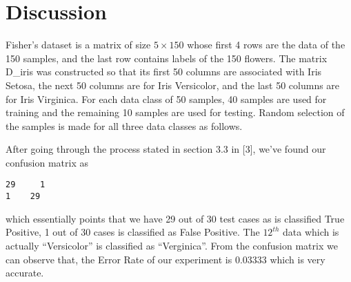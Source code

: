 \section{Discussion}
\label{sect:discussion}
Fisher’s dataset is a matrix of size $5\times150$ whose first 4 rows are the data of the 150 samples, and the last row contains labels of the 150 flowers. The matrix D\_iris was constructed so that its first 50 columns are associated with Iris Setosa, the next 50 columns are for Iris Versicolor, and the last 50 columns are for Iris Virginica. For each data class of 50 samples, 40 samples are used for training and the remaining 10 samples are used for testing. Random selection of the samples is made for all three data classes as follows. 

After going through the process stated in section 3.3 in [3], we've found our confusion matrix as
\begin{verbatim}
29     1
1    29
\end{verbatim}
which essentially points that we have 29 out of 30 test cases as is classified True Positive, 1 out of 30 cases is classified as False Positive. The $12^{th}$ data which is actually ``Versicolor'' is classified as ``Verginica''. From the confusion matrix we can observe that, the Error Rate of our experiment is 0.03333 which is very accurate.